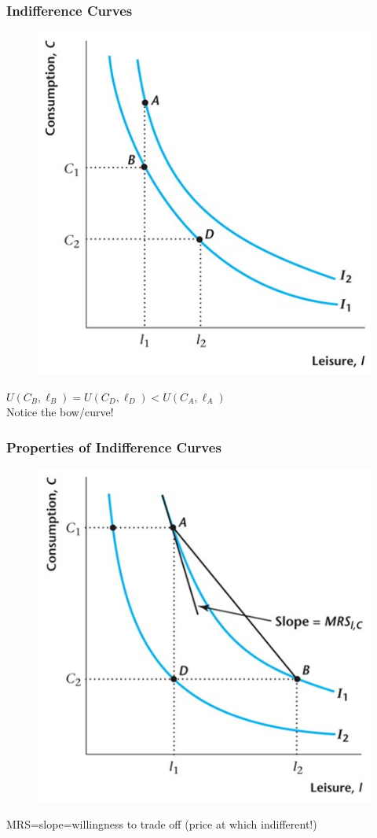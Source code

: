 \documentclass{beamer}
\begin{document}
\begin{frame}
\frametitle[alignment=center]{Indifference Curves}
\begin{figure}
\centering
\includegraphics[scale=0.5]{Figures/W_Fig_4pt1.png}
\end{figure}
$U(C_B,\ell_B)=U(C_D,\ell_D)<U(C_A,\ell_A)$\\
Notice the bow/curve!
\end{frame}

\begin{frame}
\frametitle[alignment=center]{Properties of Indifference Curves}
\begin{figure}
\centering
\includegraphics[scale=0.5]{Figures/W_Fig_4pt2.png}
\end{figure}
MRS=slope=willingness to trade off (price at which indifferent!)
\end{frame}
\end{document}
